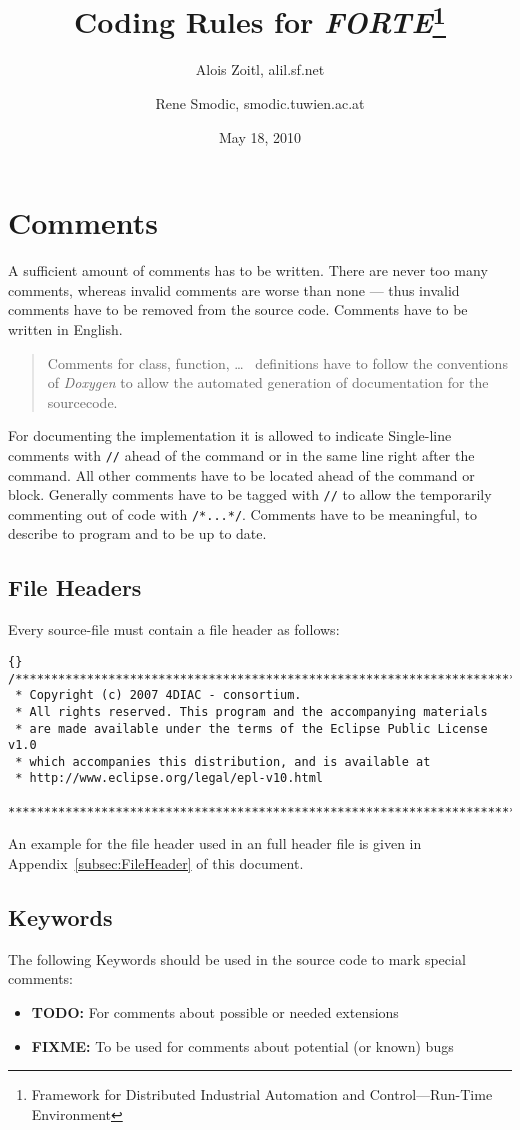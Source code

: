 \documentclass[final,a4paper,10pt, oneside]{article}
\title{Coding Rules for \emph{FORTE}\footnote{Framework for Distributed Industrial Automation and Control---Run-Time Environment}}
\author{Alois Zoitl, alil\@@users.sf.net \and Rene Smodic, smodic\@@acin.tuwien.ac.at}
\date{May 18, 2010}
\begin{document}
\maketitle

\tableofcontents

\section{Comments}
A sufficient amount of comments has to be written. There are never too many comments, whereas invalid comments are worse than none --- thus
invalid comments have to be removed from the source code. Comments have to be written in English. 

\begin{quote}
Comments for class, function, \ldots~ definitions have to follow the conventions of \emph{Doxygen} to allow the automated generation of documentation for the sourcecode. 
\end{quote}

For documenting the implementation it is allowed to indicate Single-line
comments with \verb|//| ahead of the command or in the same line right after the command. All other comments have to be located ahead of the
command or block. Generally comments have to be tagged with \verb|//| to allow the temporarily commenting out of code with \verb|/*...*/|.
Comments have to be meaningful, to describe to program and to be up to date.


\subsection{File Headers}
Every source-file must contain a file header as follows:
\begin{lstlisting}[frame=trbl]{}
/*******************************************************************************
 * Copyright (c) 2007 4DIAC - consortium.
 * All rights reserved. This program and the accompanying materials
 * are made available under the terms of the Eclipse Public License v1.0
 * which accompanies this distribution, and is available at
 * http://www.eclipse.org/legal/epl-v10.html
 *******************************************************************************
\end{lstlisting}
An example for the file header used in an full header file is given in Appendix~\ref{subsec:FileHeader} of this document.

\subsection{Keywords}
The following Keywords should be used in the source code to mark special comments:
\begin{itemize}
	\item \textbf{TODO:} For comments about possible or needed extensions
	\item \textbf{FIXME:} To be used for comments about potential (or known) bugs
\end{itemize}
\end{document}
